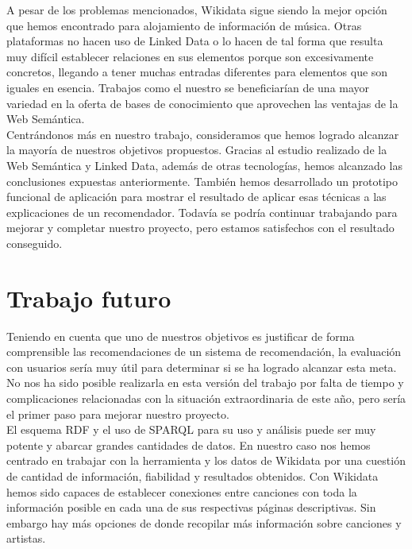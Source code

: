 A pesar de los problemas mencionados, Wikidata sigue siendo la mejor opción que hemos encontrado para alojamiento de información de música. Otras plataformas no hacen uso de Linked Data o lo hacen de tal forma que resulta muy difícil establecer relaciones en sus elementos porque son excesivamente concretos, llegando a tener muchas entradas diferentes para elementos que son iguales en esencia. Trabajos como el nuestro se beneficiarían de una mayor variedad en la oferta de bases de conocimiento que aprovechen las ventajas de la Web Semántica.\\

Centrándonos más en nuestro trabajo, consideramos que hemos logrado alcanzar la mayoría de nuestros objetivos propuestos. Gracias al estudio realizado de la Web Semántica y Linked Data, además de otras tecnologías, hemos alcanzado las conclusiones expuestas anteriormente. También hemos desarrollado un prototipo funcional de aplicación para mostrar el resultado de aplicar esas técnicas a las explicaciones de un recomendador. Todavía se podría continuar trabajando para mejorar y completar nuestro proyecto, pero estamos satisfechos con el resultado conseguido.\\

\section{Trabajo futuro}

Teniendo en cuenta que uno de nuestros objetivos es justificar de forma comprensible las recomendaciones de un sistema de recomendación, la evaluación con usuarios sería muy útil para determinar si se ha logrado alcanzar esta meta. No nos ha sido posible realizarla en esta versión del trabajo por falta de tiempo y complicaciones relacionadas con la situación extraordinaria de este año, pero sería el primer paso para mejorar nuestro proyecto.\\

El esquema RDF y el uso de SPARQL para su uso y análisis puede ser muy potente y abarcar grandes cantidades de datos. En nuestro caso nos hemos centrado en trabajar con la herramienta y los datos de Wikidata por una cuestión de cantidad de información, fiabilidad y resultados obtenidos. Con Wikidata hemos sido capaces de establecer conexiones entre canciones con toda la información posible en cada una de sus respectivas páginas descriptivas. Sin embargo hay más opciones de donde recopilar más información sobre canciones y artistas.\\ 

